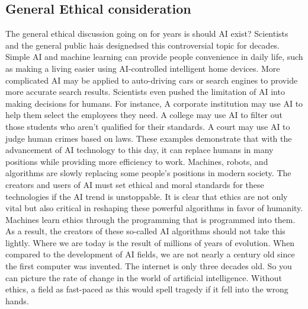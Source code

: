 \documentclass[10pt,twocolumn]{article}
\begin{document}
\subsection{General Ethical consideration}
    The general ethical discussion going on for years is should AI exist? Scientists and the general public hais designedsed this controversial topic for decades. Simple AI and machine learning can provide people convenience in daily life, such as making a living easier using AI-controlled intelligent home devices. More complicated AI may be applied to auto-driving cars or search engines to provide more accurate search results. Scientists even pushed the limitation of AI into making decisions for humans. For instance, A corporate institution may use AI to help them select the employees they need. A college may use AI to filter out those students who aren't qualified for their standards. A court may use AI to judge human crimes based on laws. These examples demonstrate that with the advancement of AI technology to this day, it can replace humans in many positions while providing more efficiency to work. Machines, robots, and algorithms are slowly replacing some people's positions in modern society. The creators and users of AI must set ethical and moral standards for these technologies if the AI trend is unstoppable\cite{EthicalIssue}. It is clear that ethics are not only vital but also critical in reshaping these powerful algorithms in favor of humanity. Machines learn ethics through the programming that is programmed into them. As a result, the creators of these so-called AI algorithms should not take this lightly. Where we are today is the result of millions of years of evolution. When compared to the development of AI fields, we are not nearly a century old since the first computer was invented. The internet is only three decades old. So you can picture the rate of change in the world of artificial intelligence. Without ethics, a field as fast-paced as this would spell tragedy if it fell into the wrong hands\cite{BillGates}.
    
\end{document}
